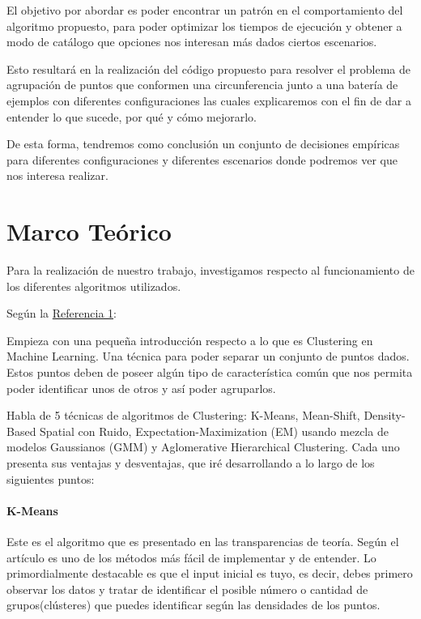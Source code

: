 \documentclass[conference,a4paper]{IEEEtran}
\begin{document}
El objetivo por abordar es poder encontrar un patrón en el comportamiento del algoritmo propuesto, para poder optimizar los tiempos de ejecución y obtener a modo de catálogo que opciones nos interesan más dados ciertos escenarios.

Esto resultará en la realización del código propuesto para resolver el problema de agrupación de puntos que conformen una circunferencia junto a una batería de ejemplos con diferentes configuraciones las cuales explicaremos con el fin de dar a entender lo que sucede, por qué y cómo mejorarlo.

De esta forma, tendremos como conclusión un conjunto de decisiones empíricas para diferentes configuraciones y diferentes escenarios donde podremos ver que nos interesa realizar.

\clearpage
\section{Marco Teórico}

Para la realización de nuestro trabajo, investigamos respecto al funcionamiento de los diferentes algoritmos utilizados.

Según la  \hyperref[bib:georgeSeif]{Referencia 1}:

Empieza con una pequeña introducción respecto a lo que es Clustering en Machine Learning. Una técnica para poder separar un conjunto de puntos dados. Estos puntos deben de poseer algún tipo de característica común que nos permita poder identificar unos de otros y así poder agruparlos.

Habla de 5 técnicas de algoritmos de Clustering: K-Means, Mean-Shift, Density-Based Spatial con Ruido, Expectation-Maximization (EM) usando mezcla de modelos Gaussianos (GMM) y Aglomerative Hierarchical Clustering. Cada uno presenta sus ventajas y desventajas, que iré desarrollando a lo largo de los siguientes puntos:\\

\paragraph{\textbf{K-Means}}

Este es el algoritmo que es presentado en las transparencias de teoría. Según el artículo es uno de los métodos más fácil de implementar y de entender. Lo primordialmente destacable es que el input inicial es tuyo, es decir, debes primero observar los datos y tratar de identificar el posible número o cantidad de grupos(clústeres) que puedes identificar según las densidades de los puntos.
\end{document}
